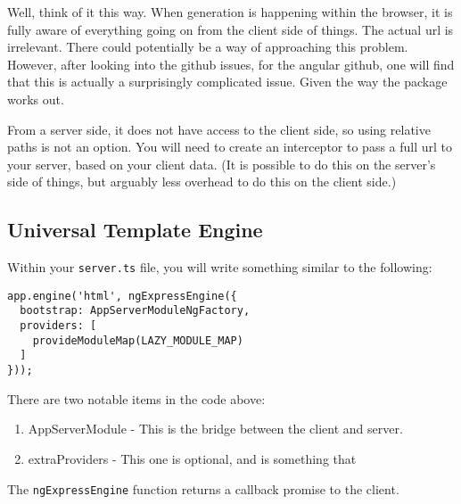 Well, think of it this way. When generation is happening within the browser, it is fully aware of everything going on from the client side of things. The actual url is irrelevant. There could potentially be a way of approaching this problem. However, after looking into the github issues, for the angular github, one will find that this is actually a surprisingly complicated issue. Given the way the package works out. 

From a server side, it does not have access to the client side, so using relative paths is not an option. You will need to create an interceptor to pass a full url to your server, based on your client data. (It is possible to do this on the server's side of things, but arguably less overhead to do this on the client side.)

\subsection{Universal Template Engine}
Within your \lstinline{server.ts} file, you will write something similar to the following: 
\begin{lstlisting}[caption=server.ts]
app.engine('html', ngExpressEngine({
  bootstrap: AppServerModuleNgFactory,
  providers: [
    provideModuleMap(LAZY_MODULE_MAP)
  ]
}));
\end{lstlisting}

There are two notable items in the code above: 
\begin{enumerate}
  \item AppServerModule - This is the bridge between the client and server. 
  \item extraProviders - This one is optional, and is something that 
\end{enumerate}

The \lstinline{ngExpressEngine} function returns a callback promise to the client. 